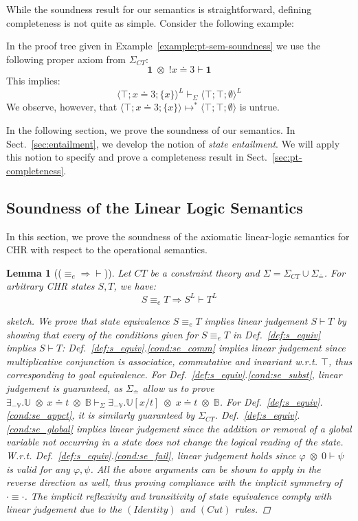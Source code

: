 \documentclass[acmtocl]{acmtrans2m}
\newtheorem{lemma}[theorem]{Lemma}
\newcommand\state[1]{\langle #1 \rangle}
\newcommand\subxt{\left[x/t\right]}
\newcommand\xet{\ensuremath{x\doteq t}}
\newcommand{\B}{\ensuremath{\mathbb{B}}}
\newcommand{\U}{\ensuremath{\mathbb{U}}}
\newcommand{\V}{\ensuremath{\mathbb{V}}}
\newcommand{\Sct}{\ensuremath{\Sigma_{CT}}}
\newcommand{\Seq}{\ensuremath{\Sigma_{\doteq}}}
\newcommand{\x}{{\;\otimes\;}}
\newcommand{\lone}{\boldsymbol{1}}
\begin{document}
While the soundness result for our semantics is straightforward, defining
completeness is not quite as simple. Consider the following example:

\begin{example}
	\label{example:pt-sem-completeness-problem}
In the proof tree given in Example~\ref{example:pt-sem-soundness} we use the
following proper axiom from $\Sct$:
\[
	\lone\x !x\doteq3\vdash\lone
\]
This implies:
\[
	\state{\top;x\doteq3;\{x\}}^L\vdash_\Sigma\state{\top;\top;\emptyset}^L
\]
We observe, however, that
$\state{\top;x\doteq3;\{x\}}\mapsto^{*}\state{\top;\top;\emptyset}$ is untrue.
\end{example}

In the following section, we prove the soundness of our semantics. In
Sect.~\ref{sec:entailment}, we develop the notion of \emph{state entailment}. We
will apply this notion to specify and prove a completeness result in
Sect.~\ref{sec:pt-completeness}.

\subsection{Soundness of the Linear Logic Semantics}
\label{sec:pt-soundness}

In this section, we prove the soundness of the axiomatic linear-logic
semantics for CHR with respect to the operational semantics.

\begin{lemma}[($\equiv_e\Rightarrow\vdash$)]
  \label{lemma:sq-ll}
  Let $CT$ be a constraint theory and $\Sigma=\Sct\cup\Seq$. For arbitrary CHR
  states $S,T$, we have: \[
 S\equiv_e T \Rightarrow S^L\vdash T^L
  \]
\begin{proof}[sketch] We prove that state equivalence $S\equiv_e T$
implies linear judgement $S\vdash T$ by showing that every of the conditions
given for $S\equiv_e T$ in Def.~\ref{def:s_equiv}
implies $S\vdash T$: Def.~\ref{def:s_equiv}.\ref{cond:se_comm}
implies linear judgement since multiplicative conjunction is associatice, commutative and invariant w.r.t.
  $\top$, thus corresponding to goal equivalence. For
  Def.~\ref{def:s_equiv}.\ref{cond:se_subst}, linear judgement is guaranteed, as
  $\Seq$ allow us to prove $\exists_{-\V}.\U\x\xet\x\B
  \vdash_\Sigma \exists_{-\V}.\U\subxt\x\xet\x\B$. For
  Def.~\ref{def:s_equiv}.\ref{cond:se_appct}, it is similarly guaranteed by $\Sct$.
  Def.~\ref{def:s_equiv}.\ref{cond:se_global} implies linear judgement since
  the addition or removal of a global variable not occurring
   in a state does not change the logical reading of the state.
  W.r.t. Def.~\ref{def:s_equiv}.\ref{cond:se_fail}, linear judgement holds since
  $\varphi\x 0\vdash\psi$ is valid for any $\varphi,\psi$.
All the above arguments can be shown to apply in the reverse direction as well,
thus proving compliance with the implicit symmetry of $\cdot\equiv\cdot$. The
implicit reflexivity and transitivity of state equivalence comply with linear
judgement due to the $(Identity)$ and $(Cut)$ rules.
\end{proof}
\end{lemma}
\end{document}
